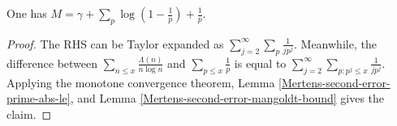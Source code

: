 \begin{theorem}
\label{Meissel-Mertens-eq}
\leanok
One has $M = \gamma + \sum_p \log(1-\frac{1}{p}) + \frac{1}{p}$.
\end{theorem}
\begin{proof}
\leanok
The RHS can be Taylor expanded as $\sum_{j=2}^\infty \sum_p \frac{1}{jp^j}$.  Meanwhile, the difference between $\sum_{n \leq x} \frac{\Lambda(n)}{n \log n}$ and $\sum_{p \leq x} \frac{1}{p}$ is equal to $\sum_{j=2}^\infty \sum_{p: p^j \leq x} \frac{1}{j p^j}$.  Applying the monotone convergence theorem, Lemma \ref{Mertens-second-error-prime-abs-le}, and Lemma \ref{Mertens-second-error-mangoldt-bound} gives the claim.
\end{proof}
